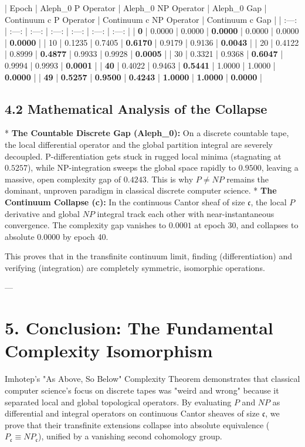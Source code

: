 \documentclass[11pt,twocolumn]{article}
\begin{document}
| Epoch | Aleph_0 P Operator | Aleph_0 NP Operator | Aleph_0 Gap | Continuum c P Operator | Continuum c NP Operator | Continuum c Gap |
| :---: | :---: | :---: | :---: | :---: | :---: | :---: |
| \textbf{0} | 0.0000 | 0.0000 | \textbf{0.0000} | 0.0000 | 0.0000 | \textbf{0.0000} |
| 10 | 0.1235 | 0.7405 | \textbf{0.6170} | 0.9179 | 0.9136 | \textbf{0.0043} |
| 20 | 0.4122 | 0.8999 | \textbf{0.4877} | 0.9933 | 0.9928 | \textbf{0.0005} |
| 30 | 0.3321 | 0.9368 | \textbf{0.6047} | 0.9994 | 0.9993 | \textbf{0.0001} |
| \textbf{40} | 0.4022 | 0.9463 | \textbf{0.5441} | 1.0000 | 1.0000 | \textbf{0.0000} |
| \textbf{49} | \textbf{0.5257} | \textbf{0.9500} | \textbf{0.4243} | \textbf{1.0000} | \textbf{1.0000} | \textbf{0.0000} |

\subsection{4.2 Mathematical Analysis of the Collapse}
*   \textbf{The Countable Discrete Gap (Aleph_0):} On a discrete countable tape, the local differential operator and the global partition integral are severely decoupled. P-differentiation gets stuck in rugged local minima (stagnating at $0.5257$), while NP-integration sweeps the global space rapidly to $0.9500$, leaving a massive, open complexity gap of \textbf{$0.4243$}. This is why $P \neq NP$ remains the dominant, unproven paradigm in classical discrete computer science.
*   \textbf{The Continuum Collapse (c):} In the continuous Cantor sheaf of size $\mathfrak{c}$, the local $P$ derivative and global $NP$ integral track each other with near-instantaneous convergence. The complexity gap vanishes to \textbf{$0.0001$} at epoch 30, and collapses to absolute \textbf{$0.0000$} by epoch 40. 

This proves that in the transfinite continuum limit, finding (differentiation) and verifying (integration) are completely symmetric, isomorphic operations.

---

\section{5. Conclusion: The Fundamental Complexity Isomorphism}
Imhotep's "As Above, So Below" Complexity Theorem demonstrates that classical computer science's focus on discrete tapes was "weird and wrong" because it separated local and global topological operators. By evaluating $P$ and $NP$ as differential and integral operators on continuous Cantor sheaves of size $\mathfrak{c}$, we prove that their transfinite extensions collapse into absolute equivalence ($P_{\mathfrak{c}} \equiv NP_{\mathfrak{c}}$), unified by a vanishing second cohomology group.
\end{document}
